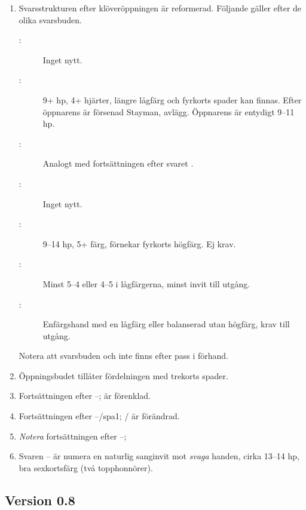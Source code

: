 \begin{enumerate}
\item Svarsstrukturen efter klöveröppningen är reformerad. Följande gäller
  efter de olika svarsbuden.
\begin{description}
\item[:] Inget nytt.
\item[:] 9+ hp, 4+ hjärter, längre lågfärg och fyrkorts spader kan
  finnas. Efter öppnarens  är  försenad Stayman,  avlägg. 
Öppnarens  är entydigt 9--11 hp.
\item[:] Analogt med fortsättningen efter svaret .
\item[:] Inget nytt.
\item[:] 9--14 hp, 5+ färg, förnekar fyrkorts högfärg. Ej krav.
\item[:] Minst 5--4 eller 4--5 i lågfärgerna, minst invit till utgång.
\item[:] Enfärgshand med en lågfärg eller balanserad utan högfärg,
  krav till utgång.
\end{description}
Notera att svarsbuden  och  inte finns efter pass i förhand.

\item Öppningsbudet  tillåter fördelningen  med
  trekorts spader.

\item Fortsättningen efter --;  är förenklad.

\item Fortsättningen efter --/spa{1}; / är förändrad.

\item \emph{Notera} fortsättningen efter --; 

\item Svaren -- är numera en naturlig sanginvit mot
  \emph{svaga} handen, cirka 13--14 hp, bra sexkortsfärg (två topphonnörer).
\end{enumerate}

\subsection*{Version 0.8}

